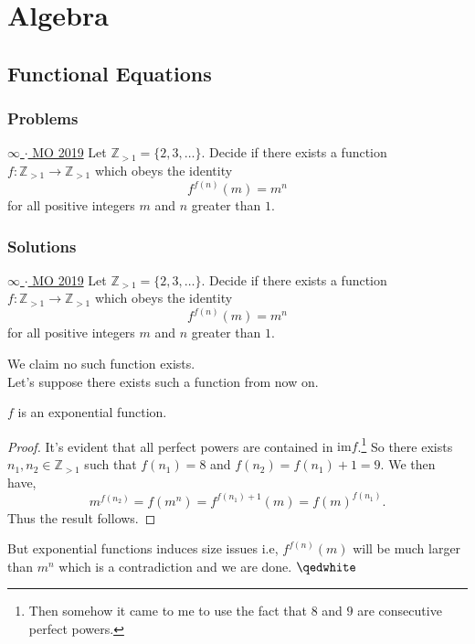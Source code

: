 \chapter{Algebra}
\section{Functional Equations}
\subsection{Problems}
\begin{problem}{1}{\href{https://otis.evanchen.cc/arch/19IDOTSJ1/}{$\infty$ $\cdot$ MO 2019}}
		Let $\mathbb{Z}_{>1}=\{2,3,\ldots\}$. Decide if there exists a function $f:\mathbb{Z}_{>1}\to \mathbb{Z}_{>1}$ which obeys the identity
		$$f^{f(n)}(m)=m^n$$
		for all positive integers $m$ and $n$ greater than $1$.
\end{problem}

\newpage
\subsection{Solutions}
\begin{problem}{1}{\href{https://otis.evanchen.cc/arch/19IDOTSJ1/}{$\infty$ $\cdot$ MO 2019}}
		Let $\mathbb{Z}_{>1}=\{2,3,\ldots\}$. Decide if there exists a function $f:\mathbb{Z}_{>1}\to \mathbb{Z}_{>1}$ which obeys the identity
		$$f^{f(n)}(m)=m^n$$
		for all positive integers $m$ and $n$ greater than $1$.
		\begin{solution} We claim no such function exists.\\
		Let's suppose there exists such a function from now on.

		\begin{claim}
			$f$ is an exponential function.
		\end{claim}
		\begin{proof} 
    It's evident that all perfect powers are contained in $\text{im}f$.\footnote{Then somehow it came to me to use the fact that $8$ and $9$ are consecutive perfect powers.} So there exists $n_1, n_2\in\mathbb{Z}_{>1}$ such that $f(n_1)=8$ and $f(n_2)=f(n_1)+1=9$. We then have,
			$$m^{f(n_2)}=f(m^n)=f^{f(n_1)+1}(m)=f(m)^{f(n_1)}.$$
		Thus the result follows.
    \end{proof}

	\indent But exponential functions induces size issues i.e, $f^{f(n)}(m)$ will be much larger than $m^n$ which is a contradiction and we are done. $\qedwhite$
  \end{solution}	
\end{problem}

